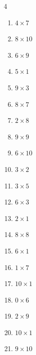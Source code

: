 \begin{multicols}{4}
\begin{enumerate}
\columnbreak %

  \item $4\times 7$
        \phantom{$=28$}

  \item $8\times 10$
        \phantom{$=80$}

  \item $6\times 9$
        \phantom{$=54$}

  \item $5\times 1$
        \phantom{$=5$}

  \item $9\times 3$
        \phantom{$=27$}

  \item $8\times 7$
        \phantom{$=56$}

  \item $2\times 8$
        \phantom{$=16$}

  \item $9\times 9$
        \phantom{$=81$}

  \item $6\times 10$
        \phantom{$=60$}

  \item $3\times 2$
        \phantom{$=6$}

  \item $3\times 5$
        \phantom{$=15$}

  \item $6\times 3$
        \phantom{$=18$}

  \item $2\times 1$
        \phantom{$=2$}

  \item $8\times 8$
        \phantom{$=64$}

  \item $6\times 1$
        \phantom{$=6$}

  \item $1\times 7$
        \phantom{$=7$}

  \item $10\times 1$
        \phantom{$=10$}

  \item $0\times 6$
        \phantom{$=0$}

  \item $2\times 9$
        \phantom{$=18$}

  \item $10\times 1$
        \phantom{$=10$}

  \item $9\times 10$
        \phantom{$=90$}


\end{enumerate}
\end{multicols}
